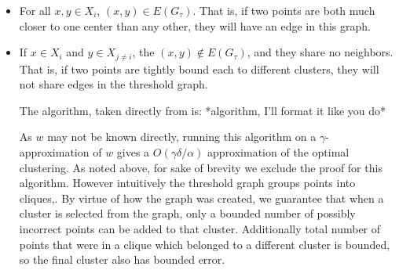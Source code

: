 \documentclass[paper=a4, fontsize=10.5pt]{scrartcl} %
\numberwithin{equation}{section} %
\numberwithin{figure}{section} %
\numberwithin{table}{section} %
\begin{document}
\begin{itemize}
\item For all $x, y \in X_i$, $(x,y) \in E(G_\tau)$. That is, if two points are both much closer to one center than any other, they will have an edge in this graph.

\item If $x \in X_i$ and $y \in X_{j \neq i}$, the $(x,y) \notin E(G_\tau)$, and they share no neighbors. That is, if two points are tightly bound each to different clusters, they will not share edges in the threshold graph. 

The algorithm, taken directly from \cite{firstpaper} is: *algorithm, I'll format it like you do*

As $w$ may not be known directly, running this algorithm on a $\gamma$-approximation of $w$ gives a $O(\gamma\delta/\alpha)$ approximation of the optimal clustering. As noted above, for sake of brevity we exclude the proof for this algorithm. However intuitively the threshold graph groups points into cliques,. By virtue of how the graph was created, we guarantee that when a cluster is selected from the graph, only a bounded number of possibly incorrect points can be added to that cluster. Additionally total number of points that were in a clique which belonged to a different cluster is bounded, so the final cluster also has bounded error. 

\end{itemize}
\end{document}
